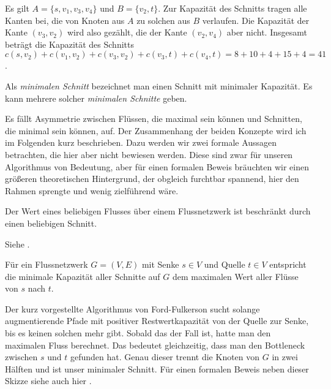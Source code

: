 Es gilt $A = \{s, v_1, v_3, v_4\}$ und $B = \{v_2, t\}$. Zur Kapazität des Schnitts tragen alle Kanten bei, die von Knoten aus $A$ zu solchen aus $B$ verlaufen. Die Kapazität der Kante $(v_3,v_2)$ wird also gezählt, die der Kante $(v_2, v_4)$ aber nicht. Insgesamt beträgt die Kapazität des Schnitts $c(s,v_2) + c(v_1, v_2) + c(v_3,v_2) + c(v_3,t) + c(v_4,t) = 8 + 10 + 4 + 15 + 4 = 41$.  

\begin{definition}
	Als \emph{minimalen Schnitt} bezeichnet man einen Schnitt mit minimaler Kapazität. Es kann mehrere solcher \emph{minimalen Schnitte} geben. 
\end{definition}

Es fällt Asymmetrie zwischen Flüssen, die maximal sein können und Schnitten, die minimal sein können, auf. Der Zusammenhang der beiden Konzepte wird ich im Folgenden kurz beschrieben. Dazu werden wir zwei formale Aussagen betrachten, die hier aber nicht bewiesen werden. Diese sind zwar für unseren Algorithmus von Bedeutung, aber für einen formalen Beweis bräuchten wir einen größeren theoretischen Hintergrund, der obgleich furchtbar spannend, hier den Rahmen sprengte und wenig zielführend wäre.

\begin{lemma}
	Der Wert eines beliebigen Flusses über einem Flussnetzwerk ist beschränkt durch einen beliebigen Schnitt.
\end{lemma}

\begin{beweis}
	Siehe \cite[S.723]{clrs09}.
\end{beweis}

\begin{satz}
	Für ein Flussnetzwerk $G = (V,E)$ mit Senke $s \in V$ und Quelle $t \in V$ entspricht die minimale Kapazität aller Schnitte auf $G$ dem maximalen Wert aller Flüsse von $s$ nach $t$. 
\end{satz} 

\begin{beweis}
	Der kurz vorgestellte Algorithmus von Ford-Fulkerson sucht solange augmentierende Pfade mit positiver Restwertkapazität von der Quelle zur Senke, bis es keinen solchen mehr gibt. Sobald das der Fall ist, hatte man den maximalen Fluss berechnet. Das bedeutet gleichzeitig, dass man den Bottleneck zwischen $s$ und $t$ gefunden hat. Genau dieser trennt die Knoten von $G$ in zwei Hälften und ist unser minimaler Schnitt. Für einen formalen Beweis neben dieser Skizze siehe auch hier \cite[S.723f.]{clrs09}.
\end{beweis} 


